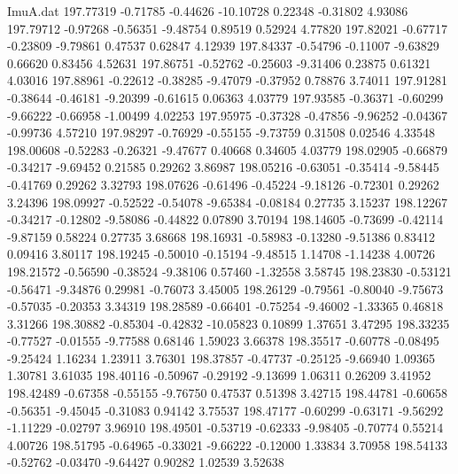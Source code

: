 \begin{filecontents}{ImuA.dat}
 197.77319   -0.71785   -0.44626  -10.10728    0.22348   -0.31802    4.93086
 197.79712   -0.97268   -0.56351   -9.48754    0.89519    0.52924    4.77820
 197.82021   -0.67717   -0.23809   -9.79861    0.47537    0.62847    4.12939
 197.84337   -0.54796   -0.11007   -9.63829    0.66620    0.83456    4.52631
 197.86751   -0.52762   -0.25603   -9.31406    0.23875    0.61321    4.03016
 197.88961   -0.22612   -0.38285   -9.47079   -0.37952    0.78876    3.74011
 197.91281   -0.38644   -0.46181   -9.20399   -0.61615    0.06363    4.03779
 197.93585   -0.36371   -0.60299   -9.66222   -0.66958   -1.00499    4.02253
 197.95975   -0.37328   -0.47856   -9.96252   -0.04367   -0.99736    4.57210
 197.98297   -0.76929   -0.55155   -9.73759    0.31508    0.02546    4.33548
 198.00608   -0.52283   -0.26321   -9.47677    0.40668    0.34605    4.03779
 198.02905   -0.66879   -0.34217   -9.69452    0.21585    0.29262    3.86987
 198.05216   -0.63051   -0.35414   -9.58445   -0.41769    0.29262    3.32793
 198.07626   -0.61496   -0.45224   -9.18126   -0.72301    0.29262    3.24396
 198.09927   -0.52522   -0.54078   -9.65384   -0.08184    0.27735    3.15237
 198.12267   -0.34217   -0.12802   -9.58086   -0.44822    0.07890    3.70194
 198.14605   -0.73699   -0.42114   -9.87159    0.58224    0.27735    3.68668
 198.16931   -0.58983   -0.13280   -9.51386    0.83412    0.09416    3.80117
 198.19245   -0.50010   -0.15194   -9.48515    1.14708   -1.14238    4.00726
 198.21572   -0.56590   -0.38524   -9.38106    0.57460   -1.32558    3.58745
 198.23830   -0.53121   -0.56471   -9.34876    0.29981   -0.76073    3.45005
 198.26129   -0.79561   -0.80040   -9.75673   -0.57035   -0.20353    3.34319
 198.28589   -0.66401   -0.75254   -9.46002   -1.33365    0.46818    3.31266
 198.30882   -0.85304   -0.42832  -10.05823    0.10899    1.37651    3.47295
 198.33235   -0.77527   -0.01555   -9.77588    0.68146    1.59023    3.66378
 198.35517   -0.60778   -0.08495   -9.25424    1.16234    1.23911    3.76301
 198.37857   -0.47737   -0.25125   -9.66940    1.09365    1.30781    3.61035
 198.40116   -0.50967   -0.29192   -9.13699    1.06311    0.26209    3.41952
 198.42489   -0.67358   -0.55155   -9.76750    0.47537    0.51398    3.42715
 198.44781   -0.60658   -0.56351   -9.45045   -0.31083    0.94142    3.75537
 198.47177   -0.60299   -0.63171   -9.56292   -1.11229   -0.02797    3.96910
 198.49501   -0.53719   -0.62333   -9.98405   -0.70774    0.55214    4.00726
 198.51795   -0.64965   -0.33021   -9.66222   -0.12000    1.33834    3.70958
 198.54133   -0.52762   -0.03470   -9.64427    0.90282    1.02539    3.52638

\end{filecontents}
